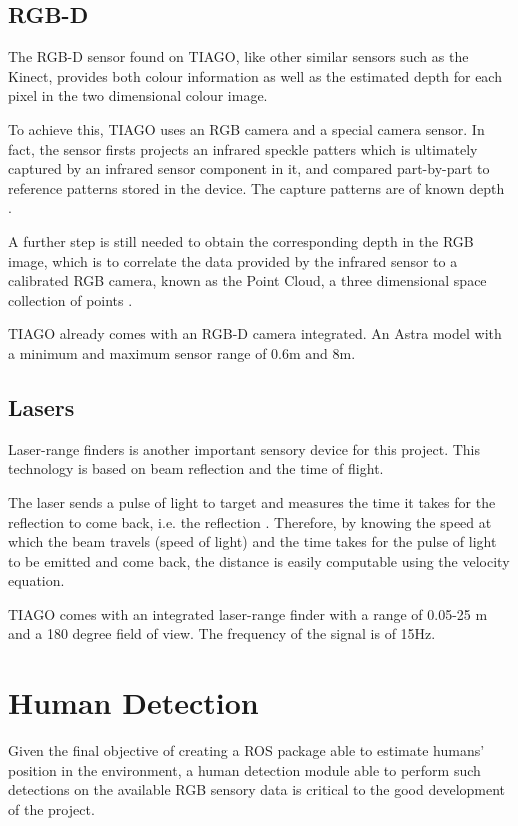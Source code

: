 \subsection{RGB-D}

The RGB-D sensor found on TIAGO, like other similar sensors such as the Kinect, provides both colour information as well as the estimated depth for each pixel in the two dimensional colour image.

To achieve this, TIAGO uses an RGB camera and a special camera sensor. In fact, the sensor firsts projects an infrared speckle patters which is ultimately captured by an infrared sensor component in it, and compared part-by-part to reference patterns stored in the device. The capture patterns are of known depth \cite{paper:RGB-D}.

A further step is still needed to obtain the corresponding depth in the RGB image, which is to correlate the data provided by the infrared sensor to a calibrated RGB camera, known as the Point Cloud, a three dimensional space collection of points \cite{paper:RGB-D}.

TIAGO already comes with an RGB-D camera integrated. An Astra model with a minimum and maximum sensor range of 0.6m and 8m.

\subsection{Lasers}

Laser-range finders is another important sensory device for this project. This technology is based on beam reflection and the time of flight.

The laser sends a pulse of light to target and measures the time it takes for the reflection to come back, i.e. the reflection \cite{website:lasers}. Therefore, by knowing the speed at which the beam travels (speed of light) and the time takes for the pulse of light to be emitted and come back, the distance is easily computable using the velocity equation.

TIAGO comes with an integrated laser-range finder with a range of 0.05-25 m and a 180 degree field of view. The frequency of the signal is of 15Hz.

\section{Human Detection}

Given the final objective of creating a ROS package able to estimate humans' position in the environment, a human detection module able to perform such detections on the available RGB sensory data is critical to the good development of the project.

